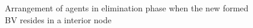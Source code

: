 \begin{itemize}
\begin{figure} [H]
      \hspace{1in} 
  \caption{Arrangement of agents in elimination phase when the new formed BV resides in a interior node} 
  \label{fig:caseone} %
\end{figure}


\end{itemize}
